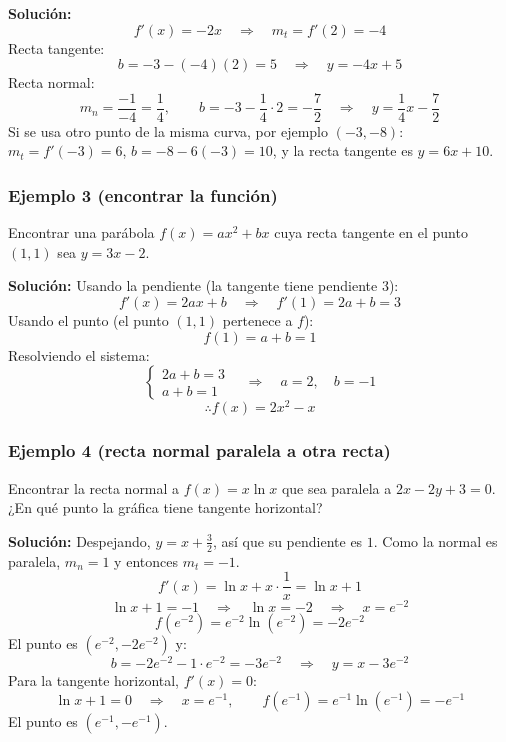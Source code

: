\documentclass[12pt]{article}
\begin{document}
\textbf{Solución:}
\[
f'(x) = -2x \quad \Rightarrow \quad m_t = f'(2) = -4
\]
Recta tangente:
\[
b = -3 - (-4)(2) = 5 \quad \Rightarrow \quad y = -4x + 5
\]
Recta normal:
\[
m_n = \frac{-1}{-4} = \frac{1}{4}, \qquad b = -3 - \frac{1}{4} \cdot 2 = -\frac{7}{2} \quad \Rightarrow \quad y = \frac{1}{4}x - \frac{7}{2}
\]
Si se usa otro punto de la misma curva, por ejemplo $(-3, -8)$: $m_t = f'(-3) = 6$, $b = -8 - 6(-3) = 10$, y la recta tangente es $y = 6x + 10$.



\subsubsection{Ejemplo 3 (encontrar la función)}


Encontrar una parábola $f(x) = ax^2 + bx$ cuya recta tangente en el punto $(1, 1)$ sea $y = 3x - 2$.

\textbf{Solución:} Usando la pendiente (la tangente tiene pendiente $3$):
\[
f'(x) = 2ax + b \quad \Rightarrow \quad f'(1) = 2a + b = 3
\]
Usando el punto (el punto $(1, 1)$ pertenece a $f$):
\[
f(1) = a + b = 1
\]
Resolviendo el sistema:
\[
\begin{cases}
2a + b = 3 \\
a + b = 1
\end{cases}
\quad \Rightarrow \quad a = 2, \quad b = -1
\]
\[
\therefore f(x) = 2x^2 - x
\]



\subsubsection{Ejemplo 4 (recta normal paralela a otra recta)}


Encontrar la recta normal a $f(x) = x \ln x$ que sea paralela a $2x - 2y + 3 = 0$. ¿En qué punto la gráfica tiene tangente horizontal?

\textbf{Solución:} Despejando, $y = x + \frac{3}{2}$, así que su pendiente es $1$. Como la normal es paralela, $m_n = 1$ y entonces $m_t = -1$.
\[
f'(x) = \ln x + x \cdot \frac{1}{x} = \ln x + 1
\]
\[
\ln x + 1 = -1 \quad \Rightarrow \quad \ln x = -2 \quad \Rightarrow \quad x = e^{-2}
\]
\[
f(e^{-2}) = e^{-2} \ln(e^{-2}) = -2e^{-2}
\]
El punto es $(e^{-2}, -2e^{-2})$ y:
\[
b = -2e^{-2} - 1 \cdot e^{-2} = -3e^{-2} \quad \Rightarrow \quad y = x - 3e^{-2}
\]
Para la tangente horizontal, $f'(x) = 0$:
\[
\ln x + 1 = 0 \quad \Rightarrow \quad x = e^{-1}, \qquad f(e^{-1}) = e^{-1}\ln(e^{-1}) = -e^{-1}
\]
El punto es $(e^{-1}, -e^{-1})$.
\end{document}

